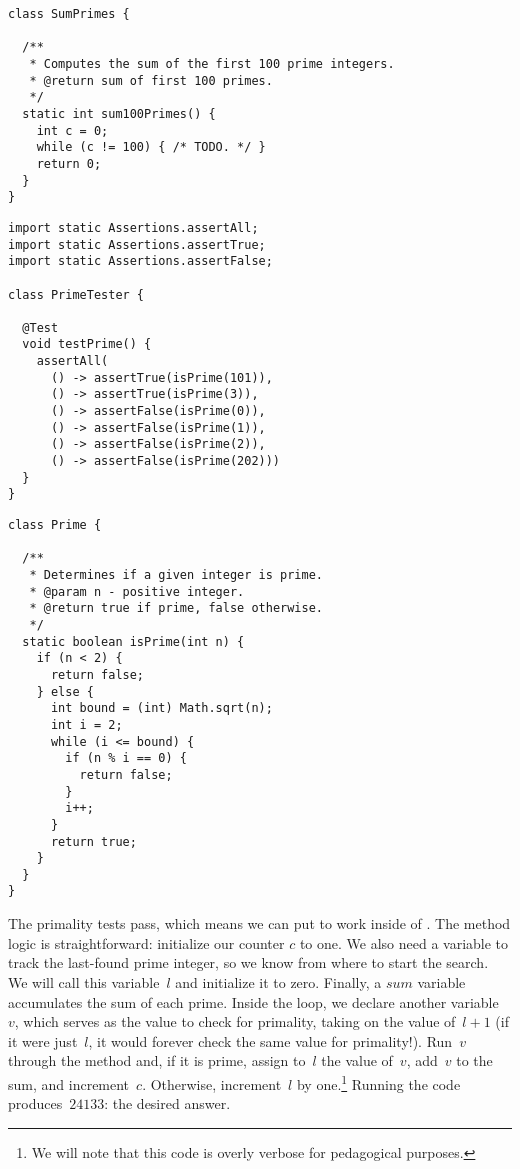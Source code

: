 \begin{lstlisting}[language=MyJava]
class SumPrimes {

  /**
   * Computes the sum of the first 100 prime integers.
   * @return sum of first 100 primes.
   */
  static int sum100Primes() {
    int c = 0;
    while (c != 100) { /* TODO. */ }
    return 0;
  }
}
\end{lstlisting}

\begin{lstlisting}[language=MyJava]
import static Assertions.assertAll;
import static Assertions.assertTrue;
import static Assertions.assertFalse;

class PrimeTester {

  @Test
  void testPrime() {
    assertAll(
      () -> assertTrue(isPrime(101)),
      () -> assertTrue(isPrime(3)),
      () -> assertFalse(isPrime(0)),
      () -> assertFalse(isPrime(1)),
      () -> assertFalse(isPrime(2)),
      () -> assertFalse(isPrime(202)))
  }
}
\end{lstlisting}


\begin{lstlisting}[language=MyJava]
class Prime {

  /**
   * Determines if a given integer is prime.
   * @param n - positive integer.
   * @return true if prime, false otherwise.
   */
  static boolean isPrime(int n) {
    if (n < 2) { 
      return false;
    } else {
      int bound = (int) Math.sqrt(n);
      int i = 2;
      while (i <= bound) {
        if (n % i == 0) {
          return false;
        }
        i++;
      }
      return true;
    }
  }
}
\end{lstlisting}

The primality tests pass, which means we can put  to work inside of . 
The method logic is straightforward: initialize our counter $c$ to one. 
We also need a variable to track the last-found prime integer, so we know from where to start the search. 
We will call this variable~$l$ and initialize it to zero. 
Finally, a $\mathit{sum}$ variable accumulates the sum of each prime. 
Inside the loop, we declare another variable~$v$, which serves as the value to check for primality, taking on the value of~$l + 1$ (if it were just~$l$, it would forever check the same value for primality!). 
Run~$v$ through the  method and, if it is prime, assign to~$l$ the value of~$v$, add~$v$ to the sum, and increment~$c$. 
Otherwise, increment~$l$ by one.\footnote{We will note that this code is overly verbose for pedagogical purposes.}
Running the code produces~$24133$: the desired answer.


